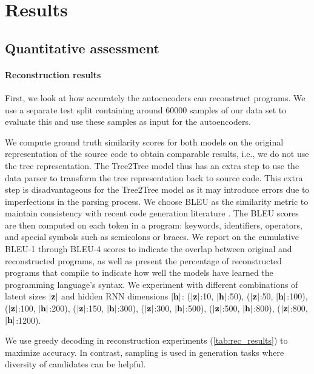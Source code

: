 \newpage
\section{Results}
\label{sec:results}

\subsection{Quantitative assessment}

\paragraph{Reconstruction results}\label{sec:recon-results}
First, we look at how accurately the autoencoders can reconstruct programs. We use a separate test split containing around 60000 samples of our data set to evaluate this and use these samples as input for the autoencoders. 


We compute ground truth similarity scores for both models on the original representation of the source code to obtain comparable results, i.e., we do not use the tree representation.
The Tree2Tree model thus has an extra step to use the data parser to transform the tree representation back to source code. This extra step is disadvantageous for the Tree2Tree model as it may introduce errors due to imperfections in the parsing process. 
We choose BLEU \cite{papineni2002bleu} as the similarity metric to maintain consistency with recent code generation literature \cite[table I]{evtikhievOutBLEUHow2023}.
The BLEU scores are then computed on each token in a program: keywords, identifiers, operators, and special symbols such as semicolons or braces. 
We report on the cumulative BLEU-1 through BLEU-4 scores to indicate the overlap between original and reconstructed programs, as well as present the percentage of reconstructed programs that compile to indicate how well the models have learned the programming language's syntax. We experiment with different combinations of latent sizes $|\mathbf{z}|$ and hidden RNN dimensions $|\mathbf{h}|$:  ($|\mathbf{z}|$:10,  $|\mathbf{h}|$:50), ($|\mathbf{z}|$:50, $|\mathbf{h}|$:100), ($|\mathbf{z}|$:100, $|\mathbf{h}|$:200), ($|\mathbf{z}|$:150, $|\mathbf{h}|$:300), ($|\mathbf{z}|$:300, $|\mathbf{h}|$:500), ($|\mathbf{z}|$:500, $|\mathbf{h}|$:800), ($|\mathbf{z}|$:800, $|\mathbf{h}|$:1200).


We use greedy decoding in reconstruction experiments (\ref{tab:rec_results}) to maximize accuracy. In contrast, sampling is used in generation tasks where diversity of candidates can be helpful.

